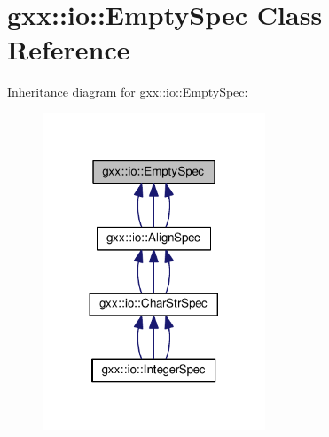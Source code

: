 \hypertarget{classgxx_1_1io_1_1EmptySpec}{}\section{gxx\+:\+:io\+:\+:Empty\+Spec Class Reference}
\label{classgxx_1_1io_1_1EmptySpec}


Inheritance diagram for gxx\+:\+:io\+:\+:Empty\+Spec\+:
\nopagebreak
\begin{figure}[H]
\begin{center}
\leavevmode
\includegraphics[width=188pt]{classgxx_1_1io_1_1EmptySpec__inherit__graph}
\end{center}
\end{figure}
